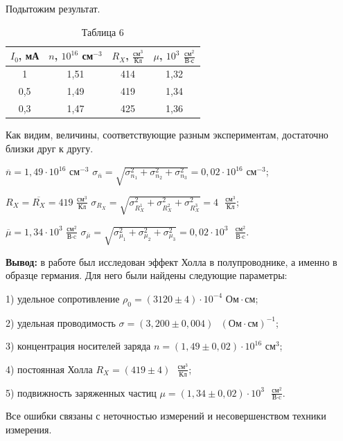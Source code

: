 \documentclass[a4paper,12pt]{article} %
\begin{document}
Подытожим результат.

\begin{table}[h!]
	\centering
	\begin{tabular}{|c|c|c|c|}
		\hline
		$I_0$, мА & $n$, $10^{16}$ см$^{-3}$ & $R_X$,  $\frac{\text{см}^3}{\text{Кл}}$ & $\mu$, $10^3$ $\frac{\text{см}^2}{\text{В}\cdot\text{с}}$ \\ \hline
		1         & 1,51                     & 414                                     & 1,32                                                      \\ \hline
		0,5       & 1,49                     & 419                                     & 1,34                                                      \\ \hline
		0,3       & 1,47                     & 425                                     & 1,36                                                      \\ \hline
	\end{tabular}
	\caption*{Таблица 6}
\end{table}

Как видим, величины, соответствующие разным экспериментам, достаточно близки друг к другу.

$\overline{n} = 1,49 \cdot 10^{16}$ см$^{-3}$ \hspace{20mm} $\sigma_{\overline{n}} = \sqrt{\sigma_{n_1}^2 + \sigma_{n_2}^2 + \sigma_{n_3}^2} = 0,02\cdot 10^{16}$ см$^{-3}$;

\vspace{2mm}
$R_X = \overline{R_X} = 419$ $\frac{\text{см}^3}{\text{Кл}}$ \hspace{18mm} $\sigma_{R_X} = \sqrt{\sigma_{R_{X}^1}^2 + \sigma_{R_{X}^2}^2 + \sigma_{R_{X}^3}^2} = 4 \text{ }\frac{\text{см}^3}{\text{Кл}}$;

\vspace{2mm}
$\overline{\mu} = 1,34 \cdot 10^3$ $\frac{\text{см}^2}{\text{В}\cdot\text{c}}$ \hspace{23mm} $\sigma_{\overline{\mu}} = \sqrt{\sigma_{\mu_1}^2 + \sigma_{\mu_2}^2 + \sigma_{\mu_3}^2} = 0,02\cdot 10^3\text{ }\frac{\text{см}^2}{\text{В}\cdot\text{c}}$.
\vspace{85mm}

\textbf{{\large Вывод:}} в работе был исследован эффект Холла в полупроводнике, а именно в образце германия. Для него были найдены следующие параметры: 

1) удельное сопротивление $\rho_0 = (3120\pm 4)\cdot 10^{-4}\text{ Ом}\cdot\text{см}$;

2) удельная проводимость $\sigma = (3,200 \pm 0,004) \text{ } (\text{Ом}\cdot\text{см})^{-1}$;
	
3) концентрация носителей заряда $n = (1,49 \pm 0,02)\cdot 10^{16}\text{ см}^3$;

4) постоянная Холла $R_X = (419 \pm 4) \text{ }\frac{\text{см}^3}{\text{Кл}}$;

5) подвижность заряженных частиц $\mu = (1,34 \pm 0,02)\cdot 10^3\text{ }\frac{\text{см}^2}{\text{В}\cdot\text{c}}$.

\noindent Все ошибки связаны с неточностью измерений и несовершенством техники измерения.
\end{document}
